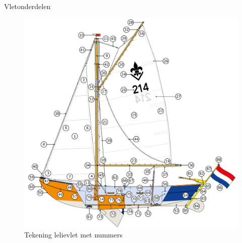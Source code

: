 \begin{table}[h!]
\centering
\caption{Vletonderdelen}

\setlength\extrarowheight{5pt} %
\renewcommand{\arraystretch}{0.75} %
\newcommand{\tabhead}[1]{\cellcolor{ocre}{\color[HTML]{FFFFFF}\sffamily \textbf{#1}}}
\newcommand{\NIL}[1]{\cellcolor{not}{#1}}
\label{table:vletwel}



\setlength\extrarowheight{0pt} %
\renewcommand{\arraystretch}{1} %

\end{table}
\newpage
\begin{figure}[h!]
    \centering
    \includegraphics[width=1.15\textwidth]{Hoofdstukken/Onderdelen/png/lelievlet_onderdelen.png}
    \caption{Tekening lelievlet met nummers \protect\footnotemark}
    \centering
    \label{pic:vlet_nummers}
\end{figure}

